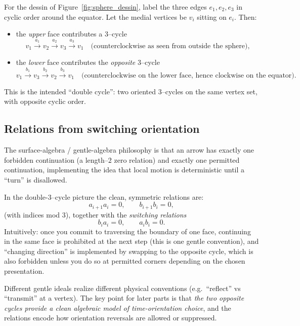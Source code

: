 \documentclass[11pt,oneside]{amsbook}
\numberwithin{equation}{section}
\theoremstyle{plain}
\theoremstyle{definition}
\theoremstyle{remark}
\begin{document}
For the dessin of Figure~\ref{fig:sphere_dessin}, label the three edges $e_1,e_2,e_3$ in cyclic order around the equator.
Let the medial vertices be $v_i$ sitting on $e_i$.
Then:
\begin{itemize}
\item the \emph{upper} face contributes a $3$--cycle
\[
v_1 \xrightarrow{a_1} v_2 \xrightarrow{a_2} v_3 \xrightarrow{a_3} v_1
\quad\text{(counterclockwise as seen from outside the sphere),}
\]
\item the \emph{lower} face contributes the \emph{opposite} $3$--cycle
\[
v_1 \xrightarrow{b_1} v_3 \xrightarrow{b_2} v_2 \xrightarrow{b_3} v_1
\quad\text{(counterclockwise on the lower face, hence clockwise on the equator).}
\]
\end{itemize}

This is the intended ``double cycle'': two oriented $3$--cycles on the same vertex set, with opposite cyclic order.

\subsection{Relations from switching orientation}
\label{sec:relations_switch}

The surface-algebra / gentle-algebra philosophy is that an arrow has exactly one forbidden continuation (a length--$2$ zero relation) and exactly one permitted continuation, implementing the idea that local motion is deterministic until a ``turn'' is disallowed.

In the double-$3$--cycle picture the clean, symmetric relations are:
\begin{equation}
\label{eq:sphere_gentle_rel}
a_{i+1}a_i = 0,\qquad
b_{i+1}b_i = 0,
\end{equation}
(with indices mod $3$), together with the \emph{switching relations}
\begin{equation}
\label{eq:sphere_switch_rel}
b_i a_i = 0,\qquad
a_i b_i = 0.
\end{equation}
Intuitively: once you commit to traversing the boundary of one face, continuing in the same face is prohibited at the next step (this is one gentle convention), and ``changing direction'' is implemented by swapping to the opposite cycle, which is also forbidden unless you do so at permitted corners depending on the chosen presentation.

Different gentle ideals realize different physical conventions (e.g.\ ``reflect'' vs ``transmit'' at a vertex).  The key point for later parts is that \emph{the two opposite cycles provide a clean algebraic model of time-orientation choice}, and the relations encode how orientation reversals are allowed or suppressed.
\end{document}
